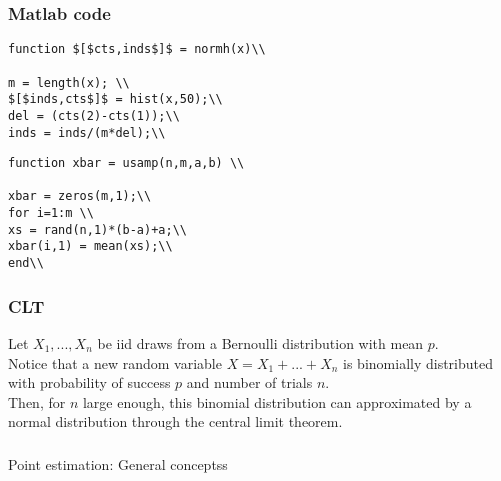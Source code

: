 \begin{frame}[fragile]\frametitle{Matlab code}

{\tiny

\begin{lstlisting}
function $[$cts,inds$]$ = normh(x)\\
  
m = length(x); \\
$[$inds,cts$]$ = hist(x,50);\\
del = (cts(2)-cts(1));\\
inds = inds/(m*del);\\
\end{lstlisting}

\vspace{.1in}

\begin{lstlisting}
function xbar = usamp(n,m,a,b) \\

xbar = zeros(m,1);\\
for i=1:m \\
xs = rand(n,1)*(b-a)+a;\\
xbar(i,1) = mean(xs);\\
end\\

\end{lstlisting}

}
\end{frame}

\begin{frame}[fragile]\frametitle{CLT}

Let $X_1,...,X_n$ be iid draws from a Bernoulli
distribution with mean $p$. \\ 

Notice that a new random variable $X=X_{1}+...+X_{n}$ is binomially distributed with probability of success $p$ and number of trials $n$. \\ 

Then, for $n$ large enough, this binomial distribution can approximated by a normal distribution through the central limit theorem. 


\end{frame}

\begin{frame}[fragile]\frametitle{}
\begin{center}
{\Large Point estimation: General conceptss}

\end{center}
\end{frame}



